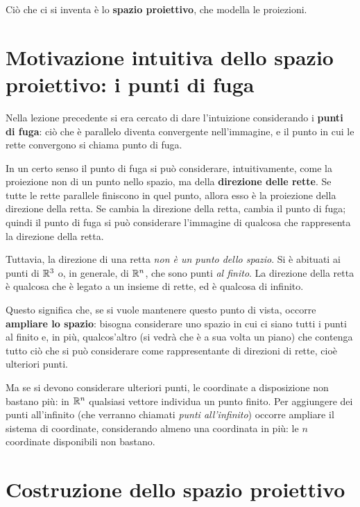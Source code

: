 Ciò che ci si inventa è lo \textbf{spazio proiettivo}, che modella le proiezioni.

\section{Motivazione intuitiva dello spazio proiettivo: i punti di fuga}

Nella lezione precedente si era cercato di dare l'intuizione considerando i \textbf{punti di fuga}: ciò che è parallelo diventa convergente nell'immagine, e il punto in cui le rette convergono si chiama punto di fuga.

In un certo senso il punto di fuga si può considerare, intuitivamente, come la proiezione non di un punto nello spazio, ma della \textbf{direzione delle rette}. Se tutte le rette parallele finiscono in quel punto, allora esso è la proiezione della direzione della retta. Se cambia la direzione della retta, cambia il punto di fuga; quindi il punto di fuga si può considerare l'immagine di qualcosa che rappresenta la direzione della retta.

Tuttavia, la direzione di una retta \emph{non è un punto dello spazio}. Si è abituati ai punti di $\mathbb{R}^3$ o, in generale, di $\mathbb{R}^n$, che sono punti \emph{al finito}. La direzione della retta è qualcosa che è legato a un insieme di rette, ed è qualcosa di infinito.

Questo significa che, se si vuole mantenere questo punto di vista, occorre \textbf{ampliare lo spazio}: bisogna considerare uno spazio in cui ci siano tutti i punti al finito e, in più, qualcos'altro (si vedrà che è a sua volta un piano) che contenga tutto ciò che si può considerare come rappresentante di direzioni di rette, cioè ulteriori punti.

Ma se si devono considerare ulteriori punti, le coordinate a disposizione non bastano più: in $\mathbb{R}^n$ qualsiasi vettore individua un punto finito. Per aggiungere dei punti all'infinito (che verranno chiamati \emph{punti all'infinito}) occorre ampliare il sistema di coordinate, considerando almeno una coordinata in più: le $n$ coordinate disponibili non bastano.

\section{Costruzione dello spazio proiettivo}

